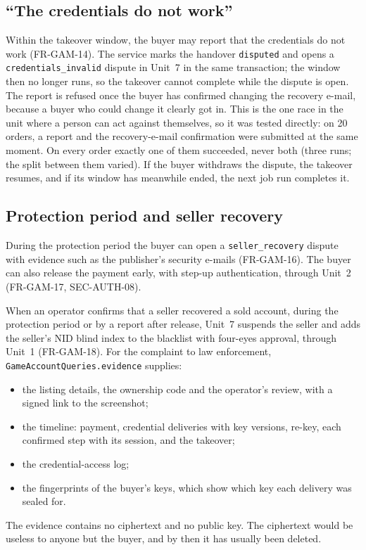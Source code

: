 \documentclass[11pt,a4paper]{article}
\begin{document}
\subsection{``The credentials do not work''}
Within the takeover window, the buyer may report that the credentials do not work (FR-GAM-14). The service marks the handover \texttt{disputed} and opens a \texttt{credentials\_invalid} dispute in Unit~7 in the same transaction; the window then no longer runs, so the takeover cannot complete while the dispute is open. The report is refused once the buyer has confirmed changing the recovery e-mail, because a buyer who could change it clearly got in. This is the one race in the unit where a person can act against themselves, so it was tested directly: on 20 orders, a report and the recovery-e-mail confirmation were submitted at the same moment. On every order exactly one of them succeeded, never both (three runs; the split between them varied). If the buyer withdraws the dispute, the takeover resumes, and if its window has meanwhile ended, the next job run completes it.

\subsection{Protection period and seller recovery}
During the protection period the buyer can open a \texttt{seller\_recovery} dispute with evidence such as the publisher's security e-mails (FR-GAM-16). The buyer can also release the payment early, with step-up authentication, through Unit~2 (FR-GAM-17, SEC-AUTH-08).

\label{sec:evidence}
When an operator confirms that a seller recovered a sold account, during the protection period or by a report after release, Unit~7 suspends the seller and adds the seller's NID blind index to the blacklist with four-eyes approval, through Unit~1 (FR-GAM-18). For the complaint to law enforcement, \texttt{GameAccountQueries.evidence} supplies:
\begin{itemize}[nosep]
  \item the listing details, the ownership code and the operator's review, with a signed link to the screenshot;
  \item the timeline: payment, credential deliveries with key versions, re-key, each confirmed step with its session, and the takeover;
  \item the credential-access log;
  \item the fingerprints of the buyer's keys, which show which key each delivery was sealed for.
\end{itemize}
The evidence contains no ciphertext and no public key. The ciphertext would be useless to anyone but the buyer, and by then it has usually been deleted.
\end{document}
